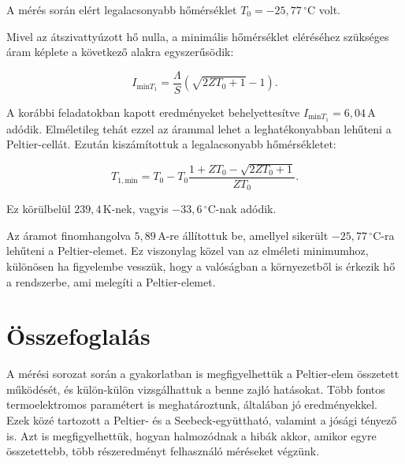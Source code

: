 \documentclass[11pt]{article}
\begin{document}
A mérés során elért legalacsonyabb hőmérséklet $T_{0} = -25,77 \,^\circ\mathrm{C}$ volt.

Mivel az átszivattyúzott hő nulla, a minimális hőmérséklet eléréséhez szükséges áram képlete a következő alakra egyszerűsödik:

$$
I_{\text{min}T_1} = \frac{\Lambda}{S} \left( \sqrt{2ZT_0 + 1} - 1 \right).
$$

A korábbi feladatokban kapott eredményeket behelyettesítve $I_{\text{min}T_1} = 6,04 \,\mathrm{A}$ adódik. Elméletileg tehát ezzel az árammal lehet a leghatékonyabban lehűteni a Peltier-cellát. Ezután kiszámítottuk a legalacsonyabb hőmérsékletet:

$$
T_{1,\text{min}} = T_0 - T_0 \frac{1 + ZT_0 - \sqrt{2ZT_0 + 1}}{ZT_0}.
$$

Ez körülbelül $239,4 \,\mathrm{K}$-nek, vagyis $-33,6 \,^\circ\mathrm{C}$-nak adódik.

Az áramot finomhangolva $5,89 \,\mathrm{A}$-re állítottuk be, amellyel sikerült $-25,77 \,^\circ\mathrm{C}$-ra lehűteni a Peltier-elemet. Ez viszonylag közel van az elméleti minimumhoz, különösen ha figyelembe vesszük, hogy a valóságban a környezetből is érkezik hő a rendszerbe, ami melegíti a Peltier-elemet.

\section*{Összefoglalás}

A mérési sorozat során a gyakorlatban is megfigyelhettük a Peltier-elem összetett működését, és külön-külön vizsgálhattuk a benne zajló hatásokat. Több fontos termoelektromos paramétert is meghatároztunk, általában jó eredményekkel. Ezek közé tartozott a Peltier- és a Seebeck-együttható, valamint a jósági tényező is. Azt is megfigyelhettük, hogyan halmozódnak a hibák akkor, amikor egyre összetettebb, több részeredményt felhasználó méréseket végzünk.
\end{document}
